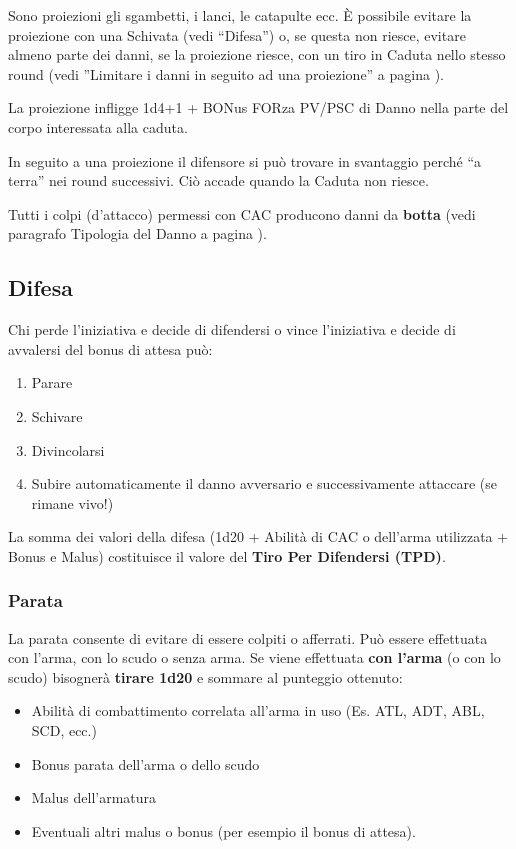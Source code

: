 Sono proiezioni gli sgambetti, i lanci, le catapulte ecc. \`E possibile
evitare la proiezione con una Schivata (vedi ``Difesa'') o, se questa
non riesce, evitare almeno parte dei danni, se la proiezione riesce, con
un tiro in Caduta nello stesso round (vedi ''Limitare i danni in
seguito ad una proiezione'' a pagina \pageref{limitaredanni}).  

La proiezione infligge 1d4+1 + BONus FORza PV/\-PSC di Danno nella
parte del corpo interessata alla caduta. 

In seguito a una proiezione il difensore si pu\`o trovare in
svantaggio perch\'e ``a terra'' nei round successivi.
Ci\`o accade quando la Caduta non riesce. 
\fi

Tutti i colpi (d'attacco) permessi con CAC producono danni da
\textbf{botta} (vedi paragrafo Tipologia del Danno a pagina \pageref{tipodanno}).

\subsection{Difesa}

Chi perde l'iniziativa e decide di difendersi o vince
l'iniziativa e decide di avvalersi del bonus di attesa pu\`o:

\begin{enumerate}
  \itemsep -6pt
\item Parare
\item Schivare
\item Divincolarsi
\item Subire automaticamente il danno avversario e successivamente
  attaccare (se rimane vivo!)
\end{enumerate}

La somma dei valori della difesa (1d20 + Abilit\`a di CAC o
dell'arma utilizzata + Bonus e Malus) costituisce il valore del
\textbf{Tiro Per Difendersi (TPD)}.

\subsubsection{Parata}
La parata consente di evitare di essere colpiti o afferrati. Pu\`o
essere effettuata con l'arma, con lo scudo o senza arma. Se viene
effettuata \textbf{con l'arma} (o con lo scudo) bisogner\`a
\textbf{tirare 1d20} e sommare al punteggio ottenuto:

\begin{itemize}
\itemsep -6pt
\item Abilit\`a di combattimento correlata all'arma in uso (Es.
  ATL, ADT, ABL, SCD, ecc.)
\item Bonus parata dell'arma o dello scudo
\item Malus dell'armatura
\item Eventuali altri malus o bonus (per esempio il bonus di attesa).
\end{itemize}

